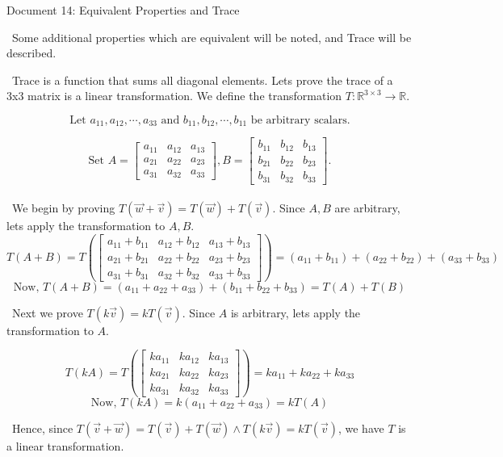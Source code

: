 \documentclass[11 pt]{article}
\begin{document}
\begin{center}
Document 14: Equivalent Properties and Trace
\end{center}

$\,\,\,$Some additional properties which are equivalent will be noted, and Trace will be described.

$\,\,\,$Trace is a function that sums all diagonal elements. Lets prove the trace of a 3x3 matrix is a linear transformation. We define the transformation $T:\mathbb{R}^{3\times 3}\rightarrow\mathbb{R}$.

$$\text{Let }a_{11},a_{12},\cdots,a_{33} \text{ and } b_{11},b_{12},\cdots,b_{11}\text{ be arbitrary scalars.}$$

$$\text{Set }A=\begin{bmatrix}a_{11} & a_{12} & a_{13}\\a_{21} & a_{22} & a_{23}\\a_{31} & a_{32} & a_{33}\end{bmatrix}, B=\begin{bmatrix}b_{11} & b_{12} & b_{13}\\b_{21} & b_{22} & b_{23}\\b_{31} & b_{32} & b_{33}\end{bmatrix}.$$\\

$\,\,\,$We begin by proving $T(\vec{w}+\vec{v})=T(\vec{w})+T(\vec{v})$. Since $A,B$ are arbitrary, lets apply the transformation to $A,B$.
$$T(A+B)=T\left(\begin{bmatrix}a_{11}+b_{11} & a_{12}+b_{12} & a_{13}+b_{13}\\a_{21}+b_{21} & a_{22}+b_{22} & a_{23}+b_{23}\\a_{31}+b_{31} & a_{32}+b_{32} & a_{33}+b_{33}\end{bmatrix}\right)=(a_{11}+b_{11})+(a_{22}+b_{22})+(a_{33}+b_{33})$$
$$\text{Now, }T(A+B)=(a_{11}+a_{22}+a_{33})+(b_{11}+b_{22}+b_{33})=T(A)+T(B)$$

$\,\,\,$Next we prove $T(k\vec{v})=kT(\vec{v})$. Since $A$ is arbitrary, lets apply the transformation to $A$.

$$T(kA)=T\left(\begin{bmatrix}ka_{11} & ka_{12} & ka_{13}\\ka_{21} & ka_{22} & ka_{23}\\ka_{31} & ka_{32} & ka_{33}\end{bmatrix}\right)=ka_{11}+ka_{22}+ka_{33}$$
$$\text{Now, }T(kA)=k(a_{11}+a_{22}+a_{33})=kT(A)$$

$\,\,\,$Hence, since $T(\vec{v}+\vec{w})=T(\vec{v})+T(\vec{w})\land T(k\vec{v})=kT(\vec{v})$, we have $T$ is a linear transformation.\\
\end{document}
